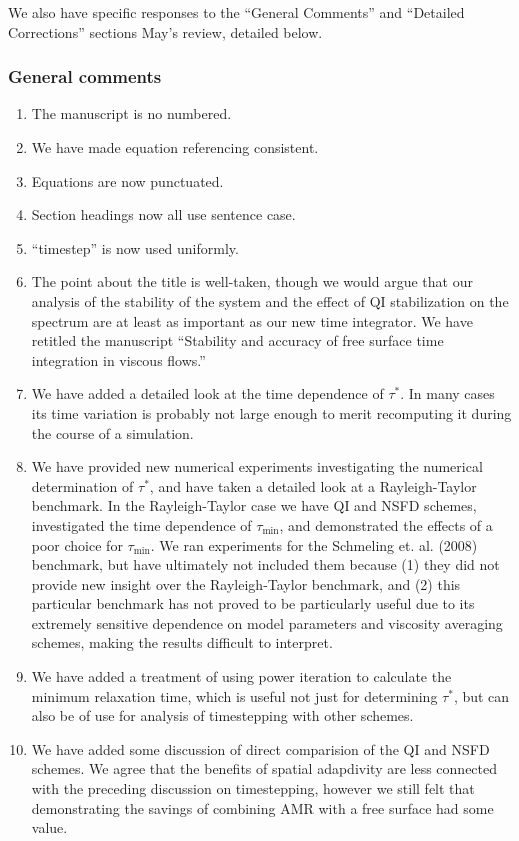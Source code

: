 \documentclass[a4paper,12pt]{article}
\begin{document}
We also have specific responses to the ``General Comments'' and ``Detailed Corrections'' sections
May's review, detailed below.

\subsubsection*{General comments}
\begin{enumerate}
  \item The manuscript is no numbered.
  \item We have made equation referencing consistent.
  \item Equations are now punctuated.
  \item Section headings now all use sentence case.
  \item ``timestep'' is now used uniformly.
  \item The point about the title is well-taken, though we would argue that our analysis of the stability of the
system and the effect of QI stabilization on the spectrum are at least as important as our new time integrator.
We have retitled the manuscript ``Stability and accuracy of free surface time integration in viscous flows.''
  \item We have added a detailed look at the time dependence of $\tau^*$. In many cases its time variation is
probably not large enough to merit recomputing it during the course of a simulation.
  \item We have provided new numerical experiments investigating the numerical determination of $\tau^*$, and have
taken a detailed look at a Rayleigh-Taylor benchmark. In the Rayleigh-Taylor case we have QI and NSFD schemes,
investigated the time dependence of $\tau_\mathrm{min}$, and demonstrated the effects of a poor choice for $\tau_\mathrm{min}$.
We ran experiments for the Schmeling et. al. (2008) benchmark, but have ultimately not included them because 
(1) they did not provide new insight over the Rayleigh-Taylor benchmark, and 
(2) this particular benchmark has not proved to be particularly useful due to its extremely sensitive dependence 
on model parameters and viscosity averaging schemes, making the results difficult to interpret.
  \item We have added a treatment of using power iteration to calculate the minimum relaxation time, which is
useful not just for determining $\tau^*$, but can also be of use for analysis of timestepping with other schemes.
  \item We have added some discussion of direct comparision of the QI and NSFD schemes. We agree that the benefits
    of spatial adapdivity are less connected with the preceding discussion on timestepping, however we still felt
    that demonstrating the savings of combining AMR with a free surface had some value.
\end{enumerate}
\end{document}

